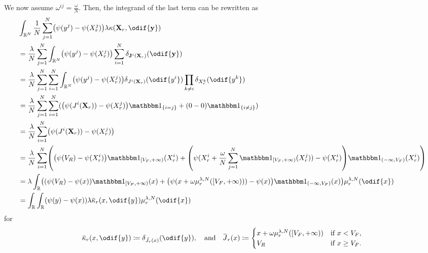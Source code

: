 We now assume \(\omega^{ij} = \frac{\omega}{N}\).
Then, the integrand of the last term can be rewritten as
\begin{equation}\label{eq:kappa-to-mean-kappa}
  \begin{split}
     & \int_{\potspace^N} \frac{1}{N} \sum_{j=1}^N \br*{ \psi(y^j) - \psi(X_{r}^j) } \lambda \kappa(\bm{X}_r, \odif{\bm{y}})                                                                  \\
     & = \frac{\lambda}{N} \sum_{j=1}^N \int_{\potspace^N} \br*{ \psi(y^j) - \psi(X_{r}^j) } \sum_{i=1}^N \delta_{\bm{\jtarg}^i(\bm{X}_r)}(\odif{\bm{y}})                                     \\
     & = \frac{\lambda}{N} \sum_{j=1}^N \sum_{i=1}^N \int_{\potspace^N} \br*{ \psi(y^j) - \psi(X_{r}^j) } \delta_{\jtarg^i(\bm{X}_r)}(\odif{y^i}) \prod_{k \neq i} \delta_{X_r^k}(\odif{y^k}) \\
     & = \frac{\lambda}{N} \sum_{j=1}^N \sum_{i=1}^N \br{ \br*{ \psi(\jtarg^i(\bm{X}_r)) - \psi(X_{r}^j) } \ind{i = j} + (0 - 0) \ind{i \neq j} }                                             \\
     & = \frac{\lambda}{N} \sum_{i=1}^N \br*{ \psi(\jtarg^i(\bm{X}_r)) - \psi(X_{r}^j) }                                                                                                      \\
     & = \frac{\lambda}{N} \sum_{i=1}^N \br*{ \br*{ \psi(V_R) - \psi(X_{r}^i) } \indE{[V_F,+\infty)}(X_{r}^i)
    + \br*{ \psi(X_{r}^i + \frac{\omega}{N} \sum_{j=1}^N \indE{[V_F,+\infty)}(X_{r}^j)) - \psi(X_{r}^i) } \indE{(-\infty,V_F)}(X_{r}^i) }                                                     \\
     & = \lambda \int_\potspace \br*{ \br*{ \psi(V_R) - \psi(x) } \indE{[V_F,+\infty)}(x)
    + \br*{ \psi(x + \omega \mu_r^{\lambda, N}([V_F,+\infty))) - \psi(x) } \indE{(-\infty,V_F)}(x) } \mu_{r}^{\lambda, N}(\odif{x})                                                           \\
     & = \int_\potspace \int_\potspace (\psi(y) - \psi(x)) \lambda \ol{\kappa}_r(x, \odif{y}) \mu_{r}^{\lambda, N}(\odif{x})
  \end{split}
\end{equation}
for
\begin{equation}
  \ol{\kappa}_r(x, \odif{y}) \coloneqq \delta_{\bar{\jtarg}_r(x)}(\odif{y}),
  \quad\text{and}\quad
  \ol{\jtarg}_r(x) \coloneqq \begin{cases}
    x + \omega \mu_r^{\lambda, N}([V_F,+\infty)) & \text{if } x < V_F,    \\
    V_R                                          & \text{if } x \geq V_F.
  \end{cases}
\end{equation}
